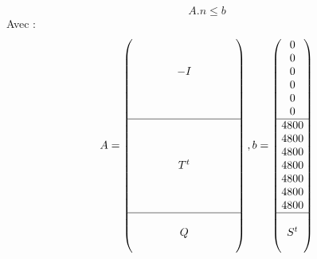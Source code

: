 \begin{equation}
A.n \leq b
\end{equation}
Avec :
\[
A =
\begin{pmatrix}
\\
\\
\quad & \quad & -I & \quad & \quad \\
\\
\\
\\
\hline
\\
\\
\\
\quad & \quad & T^{t} & \quad & \quad \\
\\
\\
\\
\hline
\\
\quad & \quad & Q & \quad & \quad \\
\\
\end{pmatrix}
, b = 
\begin{pmatrix}
0 \\ 0 \\ 0 \\ 0 \\ 0 \\ 0 \\
\hline
4800 \\ 4800 \\ 4800 \\ 4800 \\ 4800 \\ 4800 \\ 4800 \\
\hline
\\
S^{t} \\
\\
\end{pmatrix}
\]

